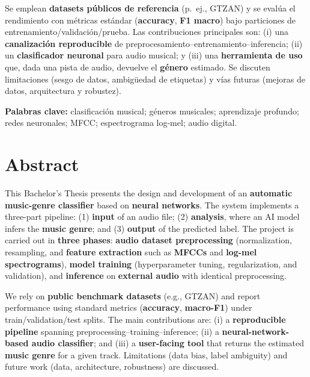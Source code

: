 \documentclass[12pt,twoside]{article}
\newenvironment{keywords}{\par\noindent\textbf{Palabras clave: }\ignorespaces}{\par}
\begin{document}
Se emplean \textbf{datasets públicos de referencia} (p.~ej., GTZAN) y se evalúa el rendimiento con métricas estándar (\textbf{accuracy}, \textbf{F1 macro}) bajo particiones de entrenamiento/validación/prueba. Las contribuciones principales son: (i) una \textbf{canalización reproducible} de preprocesamiento--entrenamiento--inferencia; (ii) un \textbf{clasificador neuronal} para audio musical; y (iii) una \textbf{herramienta de uso} que, dada una pista de audio, devuelve el \textbf{género} estimado. Se discuten limitaciones (sesgo de datos, ambigüedad de etiquetas) y vías futuras (mejoras de datos, arquitectura y robustez).

\begin{keywords}
clasificación musical; géneros musicales; aprendizaje profundo; redes neuronales; MFCC; espectrograma log-mel; audio digital.
\end{keywords}

\section*{Abstract}
This Bachelor’s Thesis presents the design and development of an \textbf{automatic music-genre classifier} based on \textbf{neural networks}. The system implements a three-part pipeline: (1) \textbf{input} of an audio file; (2) \textbf{analysis}, where an AI model infers the \textbf{music genre}; and (3) \textbf{output} of the predicted label. The project is carried out in \textbf{three phases}: \textbf{audio dataset preprocessing} (normalization, resampling, and \textbf{feature extraction} such as \textbf{MFCCs} and \textbf{log-mel spectrograms}), \textbf{model training} (hyperparameter tuning, regularization, and validation), and \textbf{inference} on \textbf{external audio} with identical preprocessing.

We rely on \textbf{public benchmark datasets} (e.g., GTZAN) and report performance using standard metrics (\textbf{accuracy}, \textbf{macro-F1}) under train/validation/test splits. The main contributions are: (i) a \textbf{reproducible pipeline} spanning preprocessing--training--inference; (ii) a \textbf{neural-network-based audio classifier}; and (iii) a \textbf{user-facing tool} that returns the estimated \textbf{music genre} for a given track. Limitations (data bias, label ambiguity) and future work (data, architecture, robustness) are discussed.
\end{document}
